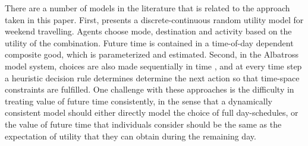 
There are a number of models in the literature that is related to the approach taken in this paper. First, \citet{Habib11RUM} presents a discrete-continuous random utility model for weekend travelling. Agents choose mode, destination and activity based on the utility of the combination. Future time is contained in a time-of-day dependent composite good, which is parameterized and estimated. Second, in the Albatross model system, choices are also made sequentially in time \citep{Arentze00}, and at every time step a heuristic decision rule determines determine the next action so that time-space constraints are fulfilled. One challenge with these approaches is the difficulty in treating value of future time consistently, in the sense that a dynamically consistent model should either directly model the choice of full day-schedules, or the value of future time that individuals consider should be the same as the expectation of utility that they can obtain during the remaining day.

%

